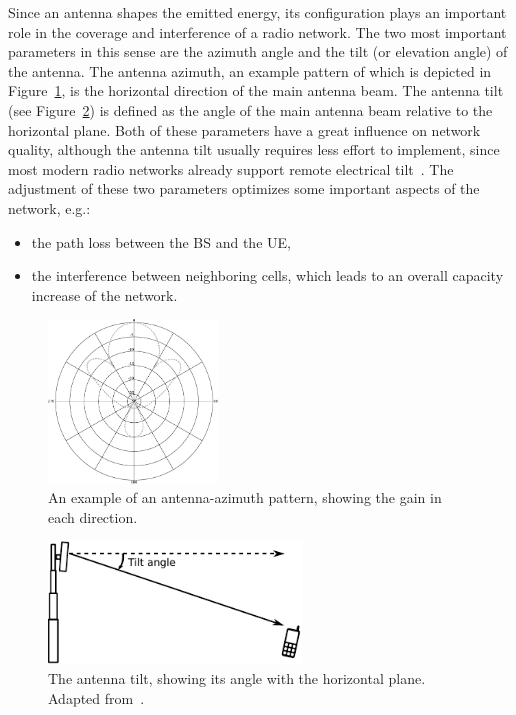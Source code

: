 Since an antenna shapes the emitted energy, its configuration plays
an important role in the coverage and interference of a radio network.
The two most important parameters in this sense are the azimuth angle
and the tilt (or elevation angle) of the antenna. The antenna azimuth,
an example pattern of which is depicted in Figure~\ref{fig:02-Antenna_azimuth},
is the horizontal direction of the main antenna beam. The antenna
tilt (see Figure~\ref{fig:02-Antenna-tilt}) is defined as the angle
of the main antenna beam relative to the horizontal plane. Both of
these parameters have a great influence on network quality, although
the antenna tilt usually requires less effort to implement, since
most modern radio networks already support remote electrical tilt~\cite{Athley-Impact_of_electrical_tilt_on_LTE_performance:2010}.
The adjustment of these two parameters optimizes some important aspects
of the network, e.g.:
\begin{itemize}
\item the path loss between the BS and the UE,
\item the interference between neighboring cells, which leads to an overall
capacity increase of the network.
\end{itemize}
\begin{figure}[h]
\centering

\includegraphics[width=0.4\textwidth]{02-background_and_motivation/img/antenna_pattern}

\caption{An example of an antenna-azimuth pattern, showing the gain in each
direction.\label{fig:02-Antenna_azimuth}}
\end{figure}


\begin{figure}
\centering

\includegraphics[width=0.6\textwidth]{02-background_and_motivation/img/antenna_tilt}

\caption{The antenna tilt, showing its angle with the horizontal plane. Adapted
from~\cite{WCDMAforUMTS_RadioAccessForThirdGenerationMobileCommunications}.\label{fig:02-Antenna-tilt}}
\end{figure}



